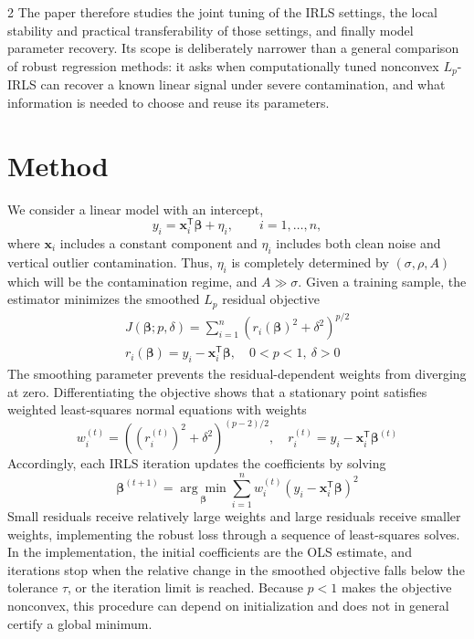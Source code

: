 \documentclass[10pt,a4paper]{article}
\begin{document}
\begin{multicols}{2}
The paper therefore studies the joint tuning of the IRLS settings, the local
stability and practical transferability of those settings, and finally model
parameter recovery. Its scope is deliberately narrower than a general
comparison of robust regression methods: it asks when computationally
tuned nonconvex $L_p$-IRLS can recover a known linear signal under severe
contamination, and what information is needed to choose and reuse its
parameters.

\section{Method}
\label{sec:method}
We consider a linear model with an intercept,
\[
  y_i = \mathbf{x}_i^\mathsf{T}\boldsymbol{\beta}+\eta_i,
  \qquad i=1,\ldots,n,
\]
where $\mathbf{x}_i$ includes a constant component and $\eta_i$ includes
both clean noise and vertical outlier contamination. Thus, $\eta_i$ is
completely determined by $(\sigma,\rho,A)$ which will be the contamination
regime, and $A\gg\sigma$. Given a training sample, the estimator minimizes the
smoothed $L_p$ residual objective
\begin{equation}
  \begin{aligned}
  J(\boldsymbol{\beta};p,\delta)
  = \sum_{i=1}^{n}
    \left(r_i(\boldsymbol{\beta})^2+\delta^2\right)^{p/2}
  \\
    r_i(\boldsymbol{\beta})
  = y_i-\mathbf{x}_i^\mathsf{T}\boldsymbol{\beta},
  \quad 0<p<1,\ \delta>0
  \label{eq:smoothed-lp}
  \end{aligned}
\end{equation}
The smoothing parameter prevents the residual-dependent weights from
diverging at zero. Differentiating the objective shows that a stationary
point satisfies weighted least-squares normal equations with weights
\begin{equation}
  w_i^{(t)}
  = \left((r_i^{(t)})^2+\delta^2\right)^{(p-2)/2},
  \quad
  r_i^{(t)}
  = y_i-\mathbf{x}_i^\mathsf{T}\boldsymbol{\beta}^{(t)}
  \label{eq:irls-weights}
\end{equation}
Accordingly, each IRLS iteration updates the coefficients by solving
\begin{equation}
  \boldsymbol{\beta}^{(t+1)}
  = \underset{\boldsymbol{\beta}}{\arg\min}
    \sum_{i=1}^{n} w_i^{(t)}
      \left(y_i-\mathbf{x}_i^\mathsf{T}\boldsymbol{\beta}\right)^2
  \label{eq:irls-update}
\end{equation}
Small residuals receive relatively large weights and large residuals receive
smaller weights, implementing the robust loss through a sequence of
least-squares solves. In the implementation, the initial coefficients are
the OLS estimate, and iterations stop when the relative change in the smoothed
objective falls below the tolerance $\tau$, or the iteration limit is reached.
Because $p<1$ makes the objective nonconvex, this procedure can depend on
initialization and does not in general certify a global minimum.


\end{multicols}
\end{document}

